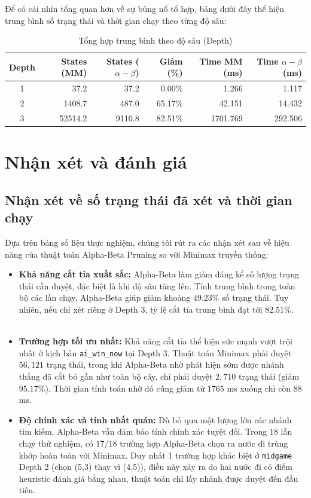 \documentclass[12pt,a4paper]{article}
\begin{document}
Để có cái nhìn tổng quan hơn về sự bùng nổ tổ hợp, bảng dưới đây thể hiện trung bình số trạng thái và thời gian chạy theo từng độ sâu:

\begin{table}[h]
\centering
\begin{tabular}{|c|r|r|r|r|r|}
\hline
\textbf{Depth} & \textbf{States (MM)} & \textbf{States ($\alpha-\beta$)} & \textbf{Giảm (\%)} & \textbf{Time MM (ms)} & \textbf{Time $\alpha-\beta$ (ms)} \\
\hline
1 & 37.2 & 37.2 & 0.00\% & 1.266 & 1.117 \\
2 & 1408.7 & 487.0 & 65.17\% & 42.151 & 14.432 \\
3 & 52514.2 & 9110.8 & 82.51\% & 1701.769 & 292.506 \\
\hline
\end{tabular}
\caption{Tổng hợp trung bình theo độ sâu (Depth)}
\end{table}

\section{Nhận xét và đánh giá}

\subsection{Nhận xét về số trạng thái đã xét và thời gian chạy}

Dựa trên bảng số liệu thực nghiệm, chúng tôi rút ra các nhận xét sau về hiệu năng của thuật toán Alpha-Beta Pruning so với Minimax truyền thống:

\begin{itemize}
    \item \textbf{Khả năng cắt tỉa xuất sắc:} Alpha-Beta làm giảm đáng kể số lượng trạng thái cần duyệt, đặc biệt là khi độ sâu tăng lên. Tính trung bình trong toàn bộ các lần chạy, Alpha-Beta giúp giảm khoảng $49.23\%$ số trạng thái. Tuy nhiên, nếu chỉ xét riêng ở Depth 3, tỷ lệ cắt tỉa trung bình đạt tới $82.51\%$.
    \item \textbf{Trường hợp tối ưu nhất:} Khả năng cắt tỉa thể hiện sức mạnh vượt trội nhất ở kịch bản \texttt{ai\_win\_now} tại Depth 3. Thuật toán Minimax phải duyệt $56,121$ trạng thái, trong khi Alpha-Beta nhờ phát hiện sớm được nhánh thắng đã cắt bỏ gần như toàn bộ cây, chỉ phải duyệt $2,710$ trạng thái (giảm $95.17\%$). Thời gian tính toán nhờ đó cũng giảm từ $1765$ ms xuống chỉ còn $88$ ms.
    \item \textbf{Độ chính xác và tính nhất quán:} Dù bỏ qua một lượng lớn các nhánh tìm kiếm, Alpha-Beta vẫn đảm bảo tính chính xác tuyệt đối. Trong $18$ lần chạy thử nghiệm, có $17/18$ trường hợp Alpha-Beta chọn ra nước đi trùng khớp hoàn toàn với Minimax. Duy nhất 1 trường hợp khác biệt ở \texttt{midgame} Depth 2 (chọn (5,3) thay vì (4,5)), điều này xảy ra do hai nước đi có điểm heuristic đánh giá bằng nhau, thuật toán chỉ lấy nhánh được duyệt đến đầu tiên.
\end{itemize}
\end{document}
